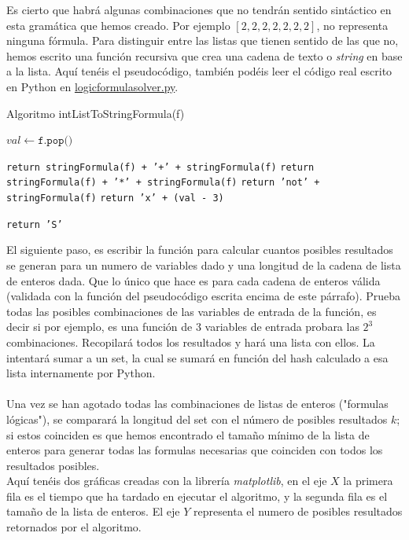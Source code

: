 \newpage
Es cierto que habrá algunas combinaciones que no tendrán sentido sintáctico en esta gramática que hemos creado. Por ejemplo $[2, 2, 2, 2, 2, 2, 2]$, no representa ninguna fórmula. Para distinguir entre las listas que tienen sentido de las que no, hemos escrito una función recursiva que crea una cadena de texto o \textit{string} en base a la lista. Aquí tenéis el pseudocódigo, también podéis leer el código real escrito en Python en \href{https://github.com/domingoUnican/TFGPedroCastro/blob/main/code/logicformula_solver/logicform_solver.py}{logicformulasolver.py}.
\begin{algorithm}
\caption{Algoritmo intListToStringFormula(f)}\label{alg:five}
 {
    $val \gets \texttt{f.pop()}$
    
     {
        \texttt{return stringFormula(f) + '+' + stringFormula(f)}\;
    }
     {
        \texttt{return stringFormula(f) + '*' + stringFormula(f)}\;
    }
     {
        \texttt{return 'not' + stringFormula(f)}\;
    }
    \texttt{return 'x' + (val - 3)}\;
}
\texttt{return 'S'}\;
\end{algorithm}

\noindent El siguiente paso, es escribir la función para calcular cuantos posibles resultados se generan para un numero de variables dado y una longitud de la cadena de lista de enteros dada. Que lo único que hace es para cada cadena de enteros válida (validada con la función del pseudocódigo escrita encima de este párrafo). Prueba todas las posibles combinaciones de las variables de entrada de la función, es decir si por ejemplo, es una función de 3 variables de entrada probara las $2^3$ combinaciones. Recopilará todos los resultados y hará una lista con ellos. La intentará sumar a un set, la cual se sumará en función del hash calculado a esa lista internamente por Python.\\\\ Una vez se han agotado todas las combinaciones de listas de enteros ("formulas lógicas"), se comparará la longitud del set con el número de posibles resultados $k$; si estos coinciden es que hemos encontrado el tamaño mínimo de la lista de enteros para generar todas las formulas necesarias que coinciden con todos los resultados posibles. \\ 
\newpage
\noindent Aquí tenéis dos gráficas creadas con la librería \textit{matplotlib}, en el eje $X$ la primera fila es el tiempo que ha tardado en ejecutar el algoritmo, y la segunda fila es el tamaño de la lista de enteros. El eje $Y$ representa el numero de posibles resultados retornados por el algoritmo.

